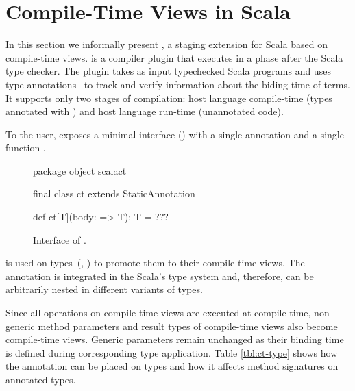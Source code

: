\section{Compile-Time Views in Scala}
\label{sct:interface}

In this section we informally present \tool, a staging extension for Scala based on compile-time views.
 \tool is a compiler plugin that executes in a phase after the
 Scala type checker. The plugin takes as input typechecked Scala programs and uses
 type annotations~\cite{odersky_1996_putting} to track and verify information about the biding-time
 of terms. It supports only two stages of compilation: host language compile-time
 (types annotated with ) and host language run-time (unannotated code).

To the user, \tool exposes a minimal interface () with
a single annotation  and a single function .

\begin{figure}
\begin{listing}
package object scalact {
  final class ct extends StaticAnnotation

  def ct[T](body: => T): T = ???
}
\end{listing}
\label{fig:interface}
\caption{Interface of \tool.}
\end{figure}

 is used on types~(\eg,
) to promote them to their compile-time views. The
annotation is integrated in the Scala's type system and, therefore, can be
arbitrarily nested in different variants of types.

Since all operations on compile-time views are executed at compile time, non-generic
 method parameters and result types of compile-time views also become compile-time views.
 Generic parameters remain unchanged as their binding time is defined during corresponding
 type application. Table \ref{tbl:ct-type}
 shows how the  annotation can be placed on types and how it affects method
 signatures on annotated types.

